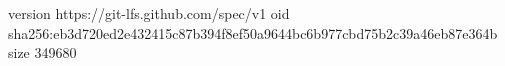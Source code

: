 version https://git-lfs.github.com/spec/v1
oid sha256:eb3d720ed2e432415c87b394f8ef50a9644bc6b977cbd75b2c39a46eb87e364b
size 349680
